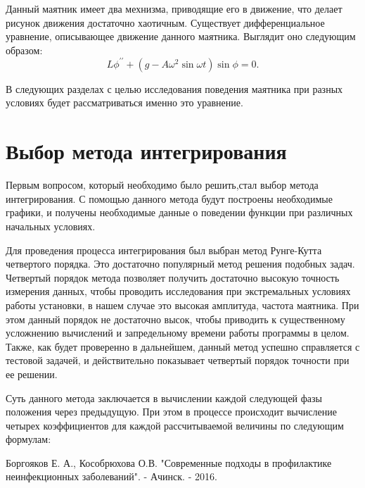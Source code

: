 \documentclass[a4paper,12pt]{article}
\begin{document}
	Данный маятник имеет два мехнизма, приводящие его в движение, что делает
	рисунок движения достаточно хаотичным. Существует дифференциальное 
	уравнение, описывающее движение данного маятника. Выглядит оно следующим
	образом:
	\[L\phi^{\prime\prime} + (g - A\omega^2 \sin\omega t) \sin\phi = 0.\]

	В следующих разделах с целью исследования поведения маятника при разных
	условиях будет рассматриваться именно это уравнение.

	\newpage
	\section{Выбор метода интегрирования}
	Первым вопросом, который необходимо было решить,стал выбор метода 
	интегрирования. С помощью данного метода будут построены необходимые 
	графики, и получены необходимые данные о поведении функции при различных
	начальных условиях.

	Для проведения процесса интегрирования был выбран метод Рунге-Кутта 
	четвертого порядка. Это достаточно популярный метод решения подобных 
	задач. Четвертый порядок метода позволяет получить достаточно высокую
	точность измерения данных, чтобы проводить исследования при экстремальных 
	условиях работы установки, в нашем случае это высокая амплитуда, частота
	маятника. При этом данный порядок не достаточно высок, чтобы приводить 
	к существенному усложнению вычислений и запредельному времени работы 
	программы в целом. Также, как будет проверенно в дальнейшем, данный метод
	успешно справляется с тестовой задачей, и действительно показывает 
	четвертый порядок точности при ее решении.

	Суть данного метода заключается в вычислении каждой следующей фазы 
	положения через предыдущую. При этом в процессе происходит вычисление
	четырех коэффициентов для каждой рассчитываемой величины по следующим
	формулам:

	

	\newpage
	
	\begin{thebibliography}{w:40}
		
		 Боргояков Е. А., Кособрюхова О.В. "Современные подходы в профилактике неинфекционных заболеваний". - Ачинск. - 2016.
		
	\end{thebibliography}
	
	
\end{document}
